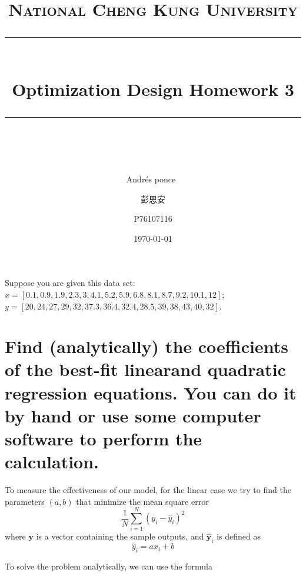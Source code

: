 \documentclass[11pt,margin=1in]{scrartcl}
\title{
	\normalfont\normalsize
	\textsc{National Cheng Kung University}\\
	\vspace{25pt}
	\rule{\linewidth}{1pt}\\
	\vspace{20pt}
	{\huge Optimization Design Homework 3}\\
	\vspace{12pt}
	\rule{\linewidth}{2pt}\\
	\vspace{12pt}
}
\author{\Large Andr\'es ponce\
	\and 彭思安
	\and P76107116
}
\date{\normalsize\today}
\newcommand{\vect}{\boldsymbol}
\newcommand{\vect}{\boldsymbol}
\begin{document}
\maketitle
Suppose you are given this data set: $x = [0.1, 0.9, 1.9, 2.3, 
3, 4.1, 5.2, 5.9, 6.8, 8.1, 8.7, 9.2, 10.1, 12]$; $y = [20, 24, 27, 29,
32, 37.3, 36.4, 32.4, 28.5, 39, 38,43, 40, 32]$.

\section{Find (analytically) the coefficients of the best-fit linearand quadratic
regression equations. You can do it by hand or use some computer software to perform the 
calculation.}
To measure the effectiveness of our model, for the linear case we try to find the 
parameters $(a,b)$ that minimize the mean square error 
\begin{equation}
	\label{eq:mse}
	\frac{1}{N}\sum_{i=1}^{N}(y_i - \hat{y}_i)^2
\end{equation}
where $\vect{y}$ is a vector containing the sample outputs, and $\hat{\vect{y}}_i$ is defined as
\begin{equation}
		\hat{y}_i = ax_i + b
	\label{eq:linear}
\end{equation}

To solve the problem analytically, we can use the formula 
\end{document}
